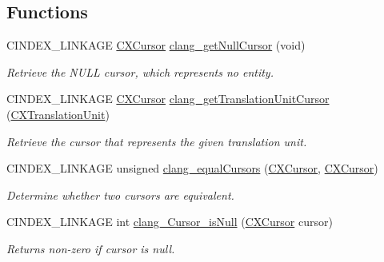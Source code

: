\subsection*{Functions}
\begin{DoxyCompactItemize}
\item 
\mbox{\label{group__CINDEX__CURSOR__MANIP_ga94d81bbf40dff4ac843458d018f3138e}} 
C\+I\+N\+D\+E\+X\+\_\+\+L\+I\+N\+K\+A\+GE \hyperlink{structCXCursor}{C\+X\+Cursor} \hyperlink{group__CINDEX__CURSOR__MANIP_ga94d81bbf40dff4ac843458d018f3138e}{clang\+\_\+get\+Null\+Cursor} (void)
\begin{DoxyCompactList}\small\item\em Retrieve the N\+U\+LL cursor, which represents no entity. \end{DoxyCompactList}\item 
C\+I\+N\+D\+E\+X\+\_\+\+L\+I\+N\+K\+A\+GE \hyperlink{structCXCursor}{C\+X\+Cursor} \hyperlink{group__CINDEX__CURSOR__MANIP_gaec6e69127920785e74e4a517423f4391}{clang\+\_\+get\+Translation\+Unit\+Cursor} (\hyperlink{group__CINDEX_gacdb7815736ca709ce9a5e1ec2b7e16ac}{C\+X\+Translation\+Unit})
\begin{DoxyCompactList}\small\item\em Retrieve the cursor that represents the given translation unit. \end{DoxyCompactList}\item 
\mbox{\label{group__CINDEX__CURSOR__MANIP_ga98df58f09878710b983b6f3f60f0cba3}} 
C\+I\+N\+D\+E\+X\+\_\+\+L\+I\+N\+K\+A\+GE unsigned \hyperlink{group__CINDEX__CURSOR__MANIP_ga98df58f09878710b983b6f3f60f0cba3}{clang\+\_\+equal\+Cursors} (\hyperlink{structCXCursor}{C\+X\+Cursor}, \hyperlink{structCXCursor}{C\+X\+Cursor})
\begin{DoxyCompactList}\small\item\em Determine whether two cursors are equivalent. \end{DoxyCompactList}\item 
\mbox{\label{group__CINDEX__CURSOR__MANIP_ga91f2a167caa704ee921e94e9397b99d9}} 
C\+I\+N\+D\+E\+X\+\_\+\+L\+I\+N\+K\+A\+GE int \hyperlink{group__CINDEX__CURSOR__MANIP_ga91f2a167caa704ee921e94e9397b99d9}{clang\+\_\+\+Cursor\+\_\+is\+Null} (\hyperlink{structCXCursor}{C\+X\+Cursor} cursor)
\begin{DoxyCompactList}\small\item\em Returns non-\/zero if {\ttfamily cursor} is null. \end{DoxyCompactList}\item 

\end{DoxyCompactItemize}
